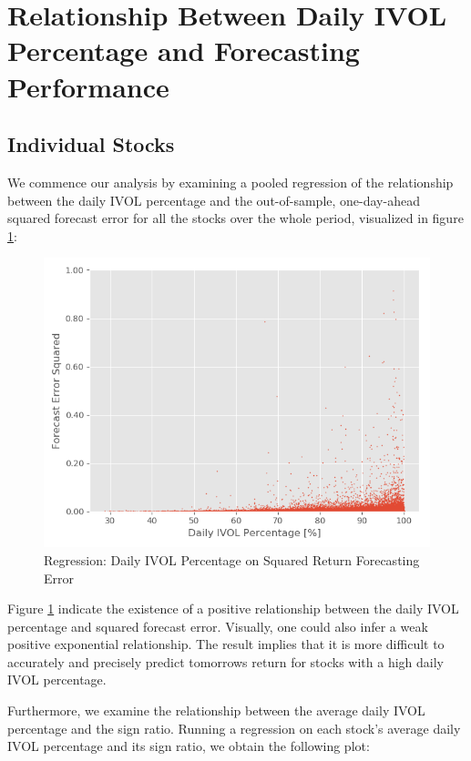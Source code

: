 \section{Relationship Between Daily IVOL Percentage and Forecasting Performance}

\subsection{Individual Stocks}

We commence our analysis by examining a pooled regression of the relationship between the daily IVOL percentage and the out-of-sample, one-day-ahead squared forecast error for all the stocks over the whole period, visualized in figure \ref{Scatter regression}: 

\begin{figure}[h]
    \centering
    \includegraphics[scale = 0.5]{Plot/ScatterRegression.png}
    \caption{Regression: Daily IVOL Percentage on Squared Return Forecasting Error}
    \label{Scatter regression}
\end{figure}

Figure \ref{Scatter regression} indicate the existence of a positive relationship between the daily IVOL percentage and squared forecast error. Visually, one could also infer a weak positive exponential relationship. The result implies that it is more difficult to accurately and precisely predict tomorrows return for stocks with a high daily IVOL percentage.

Furthermore, we examine the relationship between the average daily IVOL percentage and the sign ratio. Running a regression on each stock's average daily IVOL percentage and its sign ratio, we obtain the following plot: 


